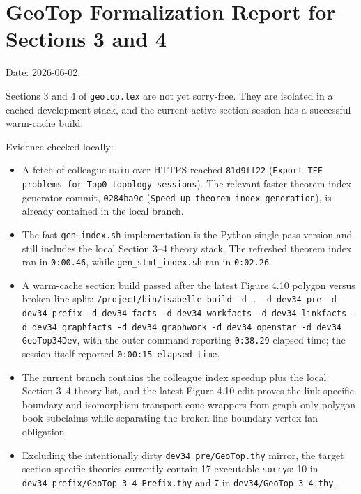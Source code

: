 \documentclass{article}
\begin{document}
\section*{GeoTop Formalization Report for Sections 3 and 4}

Date: 2026-06-02.

Sections 3 and 4 of \texttt{geotop.tex} are not yet sorry-free. They are
isolated in a cached development stack, and the current active section session
has a successful warm-cache build.

Evidence checked locally:
\begin{itemize}
\item A fetch of colleague \texttt{main} over HTTPS reached \texttt{81d9ff22}
(\texttt{Export TFF problems for Top0 topology sessions}). The relevant faster
theorem-index generator commit, \texttt{0284ba9c}
(\texttt{Speed up theorem index generation}), is already contained in the local
branch.
\item The fast \texttt{gen\_index.sh} implementation is the Python single-pass
version and still includes the local Section 3--4 theory stack. The refreshed
theorem index ran in \texttt{0:00.46}, while \texttt{gen\_stmt\_index.sh}
ran in \texttt{0:02.26}.
\item A warm-cache section build passed after the latest Figure 4.10 polygon
versus broken-line split:
\texttt{/project/bin/isabelle build -d . -d dev34\_pre -d dev34\_prefix -d dev34\_facts -d dev34\_workfacts -d dev34\_linkfacts -d dev34\_graphfacts -d dev34\_graphwork -d dev34\_openstar -d dev34 GeoTop34Dev},
with the outer command reporting \texttt{0:38.29} elapsed time; the session
itself reported \texttt{0:00:15 elapsed time}.
\item The current branch contains the colleague index speedup plus the local
Section 3--4 theory list, and the latest Figure 4.10 edit proves the
link-specific boundary and isomorphism-transport cone wrappers from graph-only
polygon book subclaims while separating the broken-line boundary-vertex fan
obligation.
\item Excluding the intentionally dirty \texttt{dev34\_pre/GeoTop.thy} mirror,
the target section-specific theories currently contain 17 executable
\texttt{sorry}s: 10 in \texttt{dev34\_prefix/GeoTop\_3\_4\_Prefix.thy} and 7 in
\texttt{dev34/GeoTop\_3\_4.thy}.
\end{itemize}
\end{document}
